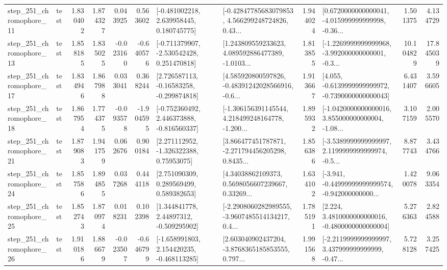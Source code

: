 \begin{tabular}{llrrrrllrlrr}
  step\_251\_chromophore\_11 &      test &      1.830402 &    1.874327 &      0.043925 &  0.563602 &    [-0.481002218, 2.639958445, 0.180745775] &  [-0.42847785683079853, 4.566299248724826, 0.43... &       1.944024 &  [0.6720000000000041, -4.015999999999998, -0.36... &            1.501375 &          4.134729 \\
  step\_251\_chromophore\_13 &      test &      1.858185 &    1.835025 &     -0.023160 & -0.640576 &   [-0.711379907, -2.530542428, 0.251470818] &  [1.243809559233623, 4.089592886477389, -1.0103... &       1.813855 &  [-1.2269999999999968, -3.992000000000001, -0.3... &           10.104829 &         17.845039 \\
  step\_251\_chromophore\_17 &      test &      1.834946 &    1.867988 &      0.033041 &  0.368244 &    [2.726587113, -0.16583258, -0.299874818] &  [4.585920800597826, -0.48391242028566916, -0.6... &       1.913667 &  [4.055, -0.6139999999999972, -0.7390000000000043] &            6.431407 &          3.596605 \\
  step\_251\_chromophore\_18 &      test &      1.867954 &    1.774375 &     -0.093578 & -1.904595 &   [-0.752360492, 2.446373888, -0.816560337] &  [-1.306156391145544, 4.218499248164778, -1.200... &       1.895932 &  [-1.0420000000000016, 3.855000000000004, -1.08... &            3.107159 &          2.005570 \\
  step\_251\_chromophore\_21 &      test &      1.879083 &    1.941759 &      0.062676 &  0.900184 &     [2.271112952, -1.326322388, 0.75953075] &  [3.866477451787871, -2.271794456205298, 0.8435... &       1.856386 &  [-3.5389999999999997, 2.1199999999999974, -0.5... &            8.877743 &          3.434766 \\
  step\_251\_chromophore\_24 &      test &      1.857586 &    1.894855 &      0.037268 &  0.444118 &     [2.751090309, 0.289569499, 0.589382653] &  [4.34038862109373, 0.5698056607239667, 0.33269... &       1.634102 &  [-3.941, -0.44999999999999574, -0.942000000000... &            1.420078 &          9.063354 \\
  step\_251\_chromophore\_25 &      test &      1.852743 &    1.870974 &      0.018231 &  0.102398 &     [1.344841778, 2.44897312, -0.509295902] &  [-2.2908060282989555, -3.9607485514134217, 0.4... &       1.785191 &   [2.224, 3.4810000000000016, -0.4800000000000004] &            5.276363 &          2.824588 \\
  step\_251\_chromophore\_26 &      test &      1.910186 &    1.886679 &     -0.023507 & -0.646799 &   [-1.658991803, 2.154420235, -0.468113285] &  [2.603040902437204, -3.8768365185853555, 0.797... &       1.991568 &  [-2.2119999999999997, 3.437999999999999, -0.47... &            5.728128 &          3.257425 \\

\end{tabular}
